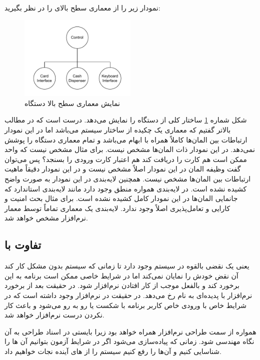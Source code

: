 نمودار زیر را از معماری سطح بالای  را در نظر بگیرید:

\begin{figure}[H]
    \centering
    \includegraphics[width=0.5\textwidth]{images/bad-arch-of-atm.drawio.pdf}
    \caption{نمایش معماری سطح بالا دستگاه }
    \label{fig:atmDiagram}
\end{figure}

شکل شماره \ref{fig:atmDiagram} ساختار کلی از دستگاه  را نمایش می‌دهد.
درست است که در مطالب بالاتر گفتیم که معماری یک چکیده از ساختار سیستم می‌باشد اما
در این نمودار ارتباطات بین المان‌ها کاملاً همراه با ابهام می‌باشد و تمام معماری
دستگاه  را پوشش نمی‌دهد. در این نمودار ذات المان‌ها مشخص نیست. برای مثال
مشخص نیست که واحد  ممکن است هم کارت را دریافت کند هم اعتبار
کارت ورودی را بسنجد؟ پس می‌توان گفت وظیفه المان  در این
نمودار اصلاً مشخص نیست و در این نمودار دقیقاً ماهیت ارتباطات بین المان‌ها مشخص
نیست. همچنین لایه‌بندی در این نمودار به صورت واضح کشیده نشده است. در لایه‌بندی
همواره منطق وجود دارد مانند لایه‌بندی استاندارد  که جانمایی المان‌ها در
این نمودار کامل کشیده نشده است. برای مثال بحث امنیت و کارایی و تعامل‌پذیری اصلاً
وجود ندارد. لایه‌بندی یک معماری تماماً توسط معمار نرم‌افزار مشخص خواهد شد.

\subsection{تفاوت  با }

 یعنی یک نقضی بالقوه در سیستم وجود دارد تا زمانی که سیستم بدون مشکل
کار کند آن نقض خودش را نمایان نمی‌کند اما در شرایط خاصی ممکن است برنامه به این
 برخورد کند و بالفعل موجب از کار افتادن نرم‌افزار شود. در حقیقت بعد از
برخورد نرم‌افزار با  پدیده‌ای به نام  رخ می‌دهد. در حقیقت
 در نرم‌افزار وجود داشته است که در شرایط خاص با ورودی خاص کاربر برنامه
با شکست یا  رو به رو می‌شود و باعث کار نکردن درست نرم‌افزار خواهد
شد.

همواره  از سمت طراحی نرم‌افزار همراه خواهد بود زیرا بایستی در اسناد
طراحی به آن نگاه مهندسی شود. زمانی که پیاده‌سازی می‌شود اگر در شرایط آزمون
بتوانیم آن ها را شناسایی کنیم و آن‌ها را رفع کنیم سیستم را از
های آینده نجات خواهیم داد.

